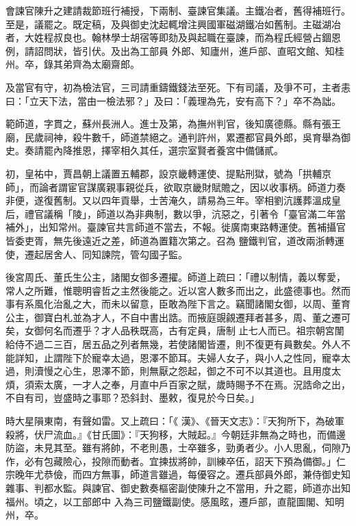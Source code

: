 \begin{pinyinscope}
 會諫官陳升之建請裁節班行補授，下兩制、臺諫官集議。主鐵冶者，舊得補班行。至是，議罷之。既定稿，及與御史沈起輒增注興國軍磁湖鐵冶如舊制。主磁湖冶者，大姓程叔良也。翰林學士胡宿等即劾及與起職在臺諫，而為程氏經營占錮恩例，請詔問狀，皆引伏。及出為工部員
 外郎、知廬州，進戶部、直昭文館、知桂州。卒，錄其弟齊為太廟齋郎。



 及當官有守，初為檢法官，三司請重鑄鐵錢法至死。下有司議，及爭不可，主者恚曰：「立天下法，當由一檢法邪？」及曰：「義理為先，安有高下？」卒不為詘。



 範師道，字貫之，蘇州長洲人。進士及第，為撫州判官，後知廣德縣。縣有張王廟，民歲祠神，殺牛數千，師道禁絕之。通判許州，累遷都官員外郎，吳育舉為御史。奏請罷內降推恩，擇宰相久其任，選宗室賢者養宮中備儲貳。



 初，皇祐中，賈昌朝上議置五輔郡，設京畿轉運使、提點刑獄，號為「拱輔京師」，而論者謂宦官謀廣親事親從兵，欲取京畿財賦贍之，因以收事柄。師道力奏非便，遂復舊制。又以四年貢舉，士苦淹久，請易為三年。宰相劉沆護葬溫成皇后，禮官議稱「陵」，師道以為非典制，數以爭，沆惡之，引著令「臺官滿二年當補外」，出知常州。臺諫官共言師道不當去，不報。徙廣南東路轉運使。舊補攝官皆委吏胥，無先後遠近之差，師道為置籍次第之。召為
 鹽鐵判官，道改兩浙轉運使，遷起居舍人、同知諫院，管勾國子監。



 後宮周氏、董氏生公主，諸閣女御多遷擢。師道上疏曰：「禮以制情，義以奪愛，常人之所難，惟聰明睿哲之主然後能之。近以宮人數多而出之，此盛德事也。然而事有系風化治亂之大，而未以留意，臣敢為陛下言之。竊聞諸閣女御，以周、董育公主，御寶白札並為才人，不自中書出誥。而掖庭覬覦遷拜者甚多，周、董之遷可矣，女御何名而遷乎？才人品秩既高，古有定員，唐制
 止七人而已。祖宗朝宮闈給侍不過二三百，居五品之列者無幾，若使諸閣皆遷，則不復更有員數矣。外人不能詳知，止謂陛下於寵幸太過，恩澤不節耳。夫婦人女子，與小人之性同，寵幸太過，則瀆慢之心生，恩澤不節，則無厭之怨起，御之不可不以其道也。且用度太煩，須索太廣，一才人之奉，月直中戶百家之賦，歲時賜予不在焉。況誥命之出，不自有司，豈盛時之事耶？恐斜封、墨敕，復見於今日矣。」



 時大星隕東南，有聲如雷。又上疏曰：「《
 漢》、《晉天文志》：『天狗所下，為破軍殺將，伏尸流血。』《甘氏圖》：『天狗移，大賊起。』今朝廷非無為之時也，而備邊防盜，未見其至。雖有將帥，不老則愚，士卒雖多，勁勇者少。小人思亂，伺隙乃作，必有包藏險心，投隙而動者。宜揀拔將帥，訓練卒伍，詔天下預為備御。」仁宗晚年尤恭儉，而四方無事，師道言雖過，每優容之。遷兵部員外郎，兼侍御史知雜事、判都水監。與諫官、御史數奏樞密副使陳升之不當用，升之罷，師道亦出知福州。頃之，以工部郎中
 入為三司鹽鐵副使。感風眩，遷戶部，直龍圖閣、知明州，卒。




\end{pinyinscope}
